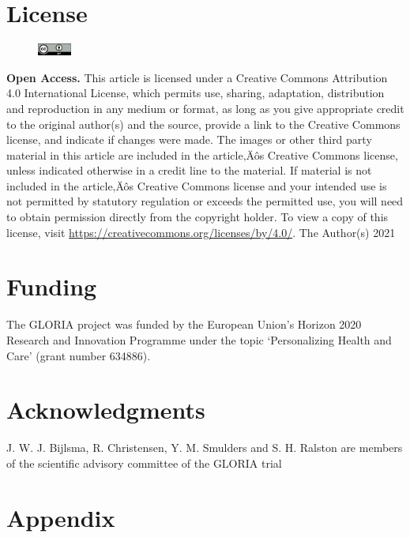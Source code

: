 \documentclass[twocolumn, serif, empirical, authordate]{jote-article}
\begin{document}
\printbibliography
\newpage
    \section*{License}
        \begin{figure}%
        \vspace{-12pt}
        \includegraphics[width=0.1\textwidth]{media/by}%
        \end{figure}
        \textbf{\textsf{Open Access.}} This article is licensed under a Creative Commons Attribution 4.0 International License, which permits use, sharing, adaptation, distribution and reproduction in any medium or format, as long as you give appropriate credit to the original author(s) and the source, provide a link to the Creative Commons license, and indicate if changes were made. The images or other third party material in this article are included in the article‚Äôs Creative Commons license, unless indicated otherwise in a credit line to the material. If material is not included in the article‚Äôs Creative Commons license and your intended use is not permitted by statutory regulation or exceeds the permitted use, you will need to obtain permission directly from the copyright holder. To view a copy of this license, visit \href{https://creativecommons.org/licenses/by/4.0/}{https://creativecommons.org/licenses/by/4.0/}.
        \newline\newline
        \textcopyright \text{ }The Author(s) 2021%

\section*{Funding}
The GLORIA project was funded by the European Union’s Horizon 2020 Research and Innovation Programme under the topic ‘Personalizing Health and Care’ (grant number 634886).
\section*{Acknowledgments}
J. W. J. Bijlsma, R. Christensen, Y. M. Smulders and S. H. Ralston are members of the scientific advisory committee of the GLORIA trial

\onecolumn
\section*{Appendix}
\end{document}
